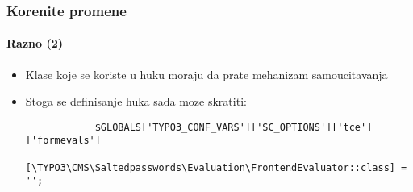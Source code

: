 \begin{frame}[fragile]
	\frametitle{Korenite promene}
	\framesubtitle{Razno (2)}

	\lstset{basicstyle=\tiny\ttfamily}

	\begin{itemize}

		\item Klase koje se koriste u huku moraju da prate mehanizam samoucitavanja
		\item Stoga se definisanje huka sada moze skratiti:

		\begin{lstlisting}
			$GLOBALS['TYPO3_CONF_VARS']['SC_OPTIONS']['tce']['formevals']
			  [\TYPO3\CMS\Saltedpasswords\Evaluation\FrontendEvaluator::class] = '';
		\end{lstlisting}

	\end{itemize}

	\breakingchange

\end{frame}

